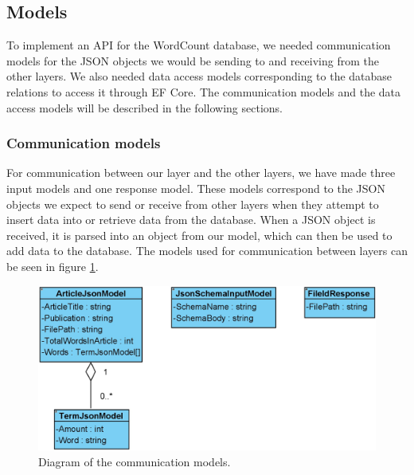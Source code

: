 \subsection{Models}\label{models}
To implement an API for the WordCount database, we needed communication models for the JSON objects we would be sending to and receiving from the other layers. 
We also needed data access models corresponding to the database relations to access it through EF Core. 
The communication models and the data access models will be described in the following sections.

\subsubsection*{Communication models}
For communication between our layer and the other layers, we have made three input models and one response model. 
These models correspond to the JSON objects we expect to send or receive from other layers when they attempt to insert data into or retrieve data from the database. 
When a JSON object is received, it is parsed into an object from our model, which can then be used to add data to the database. The models used for communication between layers can be seen in figure \ref*{fig:CommunicationModels}.
\\
\begin{figure}[H]
    \centering
    \includegraphics[scale=0.4]{Images/CommunicationModels.jpg}
    \caption{Diagram of the communication models.}
    \label{fig:CommunicationModels}
\end{figure}

